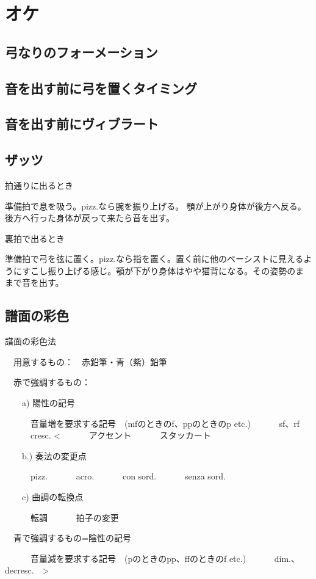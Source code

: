 \documentclass{jarticle}
\begin{document}
\clearpage

\section{オケ}
\subsection{弓なりのフォーメーション}
\subsection{音を出す前に弓を置くタイミング}
\subsection{音を出す前にヴィブラート}
\subsection{ザッツ}

拍通りに出るとき

準備拍で息を吸う。pizz.なら腕を振り上げる。
顎が上がり身体が後方へ反る。後方へ行った身体が戻って来たら音を出す。


裏拍で出るとき

準備拍で弓を弦に置く。pizz.なら指を置く。置く前に他のベーシストに見えるようにすこし振り上げる感じ。顎が下がり身体はやや猫背になる。その姿勢のままで音を出す。



\subsection{譜面の彩色}
譜面の彩色法

　用意するもの：　赤鉛筆・青（紫）鉛筆

　赤で強調するもの：

　　a) 陽性の記号

　　　音量増を要求する記号　(mfのときのf、ppのときのp  etc.)
　　　sf、rf
　　　cresc.  <
　　　アクセント
　　　スタッカート

　　b.) 奏法の変更点

　　　pizz.
　　　acro.
　　　con sord.
　　　senza sord.

　　c) 曲調の転換点

　　　転調
　　　拍子の変更

　青で強調するもの=陰性の記号

　　　音量減を要求する記号　(pのときのpp、ffのときのf  etc.)
　　　dim.、decresc.　>
\end{document}
